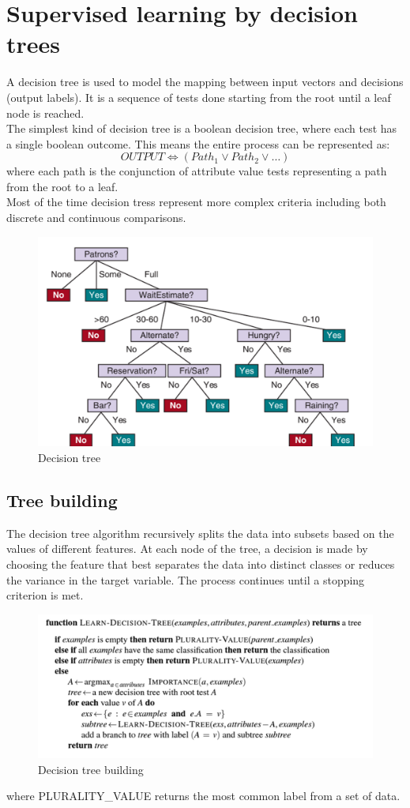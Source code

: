 \documentclass[a4paper,12pt,answers]{article}
\begin{document}
	\section{Supervised learning by decision trees}
	A decision tree is used to model the mapping between input vectors and decisions (output labels). It is a sequence of tests done starting from the root until a leaf node is reached.
	\\[4pt]
	The simplest kind of decision tree is a boolean decision tree, where each test has a single boolean outcome. This means the entire process can be represented as:
	\[
	OUTPUT \iff \left( Path_1 \lor Path_2 \lor \dots \right)
	\]
	where each path is the conjunction of attribute value tests representing a path from the root to a leaf.
	\\[4pt]
	\noindent
	Most of the time decision tress represent more complex criteria including both discrete and continuous comparisons. 
	\begin{figure}[H]
		\centering
		\includegraphics[width=0.7\linewidth]{dec_tree}
		\caption{Decision tree}
		\label{fig:dectree}
	\end{figure}
	
	\newpage
	\subsection{Tree building}
	The decision tree algorithm recursively splits the data into subsets based on the values of different features. At each node of the tree, a decision is made by choosing the feature that best separates the data into distinct classes or reduces the variance in the target variable. The process continues until a stopping criterion is met.
	\begin{figure}[H]
		\centering
		\includegraphics[width=0.7\linewidth]{dec_tree_building}
		\caption{Decision tree building}
		\label{fig:dectreebuilding}
	\end{figure}
	\noindent
	where PLURALITY\_VALUE returns the most common label from a set of data.
	
\end{document}

